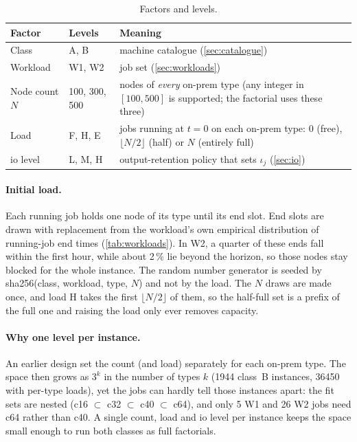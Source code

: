 \documentclass[11pt,a4paper]{article}
\newcommand{\ioVol}{\iota_j}
\begin{document}
\begin{table}[ht]
\centering\small
\caption{Factors and levels.}
\label{tab:factors}
\begin{tabularx}{\linewidth}{llX}
\toprule
Factor & Levels & Meaning \\
\midrule
Class & A, B & machine catalogue (\cref{sec:catalogue}) \\
Workload & W1, W2 & job set (\cref{sec:workloads}) \\
Node count $N$ & 100, 300, 500 & nodes of \emph{every} on-prem type (any integer in $[100,500]$ is
  supported; the factorial uses these three) \\
Load & F, H, E & jobs running at $t=0$ on each on-prem type: 0 (free),
  $\lfloor N/2\rfloor$ (half) or $N$ (entirely full) \\
io level & L, M, H & output-retention policy that sets $\ioVol$ (\cref{sec:io}) \\
\bottomrule
\end{tabularx}
\end{table}

\paragraph{Initial load.} Each running job holds one node of its type until its
end slot. End slots are drawn with replacement from the workload's own empirical
distribution of running-job end times (\cref{tab:workloads}). In W2, a
quarter of these ends fall within the first hour, while about 2\,\% lie beyond the
horizon, so those nodes stay blocked for the whole instance. The random number
generator is seeded by sha256(class, workload, type, $N$) and not by the load.
The $N$ draws are made once, and load H takes the first $\lfloor N/2\rfloor$ of
them, so the half-full set is a prefix of the full one and raising the load only
ever removes capacity.

\paragraph{Why one level per instance.} An earlier design set the count (and
load) separately for each on-prem type. The space then grows as $3^k$ in the number
of types $k$ (\num{1944} class~B instances, \num{36450} with per-type loads),
yet the jobs can hardly tell those instances apart: the fit sets are nested
(c16 $\subset$ c32 $\subset$ c40 $\subset$ c64), and only 5 W1 and 26
W2 jobs need c64 rather than c40. A single count, load and io level per
instance keeps the space small enough to run both classes as full factorials.
\end{document}
